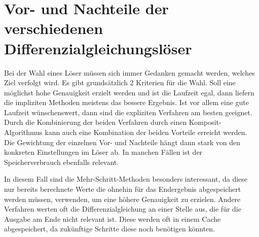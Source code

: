 
\section{Vor- und Nachteile der verschiedenen Differenzialgleichungslöser} \label{sec:chose_solver}

Bei der Wahl eines Löser müssen sich immer Gedanken gemacht werden, welches Ziel verfolgt wird.
Es gibt grundsätzlich 2 Kriterien für die Wahl.
Soll eine möglichst hohe Genauigkeit erzielt werden und ist die Laufzeit egal, 
dann liefern die impliziten Methoden meistens das bessere Ergebnis.
Ist vor allem eine gute Laufzeit wünschenswert, dann sind die expliziten Verfahren am besten 
geeignet.
Durch die Kombinierung der beiden Verfahren durch einen Komposit-Algorithmus kann auch eine Kombination
der beiden Vorteile erreicht werden.
Die Gewichtung der einzelnen Vor- und Nachteile hängt dann stark von den konkreten Einstellungen 
im Löser ab. 
In manchen Fällen ist der Speicherverbrauch ebenfalls relevant.

In diesem Fall sind
die Mehr-Schritt-Methoden besonders interessant, da diese nur bereits berechnete Werte
die ohnehin für das Endergebnis abgespeichert werden müssen, verwenden, um eine höhere Genauigkeit zu erzielen.
Andere Verfahren werten oft die Differenzialgleichung an einer Stelle aus, die für die Ausgabe am 
Ende nicht relevant ist. Diese werden oft in einem Cache abgespeichert, da zukünftige Schritte 
diese noch benötigen könnten.



